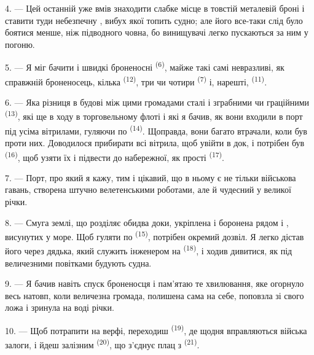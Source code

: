 \VUsaut{3.0mm}
\VUsaut{3.0mm}

4. --- Цей останній уже вмів  знаходити слабке місце в товстій
металевій броні і ставити туди небезпечну , вибух якої топить
судно; але його все-таки слід було боятися менше, ніж підводного човна, бо
винищувачі легко пускаються за ним у погоню.

5. --- Я міг бачити і швидкі броненосні  \textsuperscript{(6)},
майже такі самі невразливі, як справжній броненосець, кілька
 \textsuperscript{(12)}, три чи чотири 
\textsuperscript{(7)} і, нарешті,  \textsuperscript{(11)}.

6. --- Яка різниця в будові між цими громадами сталі і зграбними
 чи граційними 
\textsuperscript{(13)}, які ще в ходу в торговельному флоті і які я бачив, як
вони входили в порт під усіма вітрилами, гуляючи по 
\textsuperscript{(14)}. Щоправда, вони багато втрачали, коли  був
проти них. Доводилося прибирати всі вітрила, щоб увійти в док, і потрібен був
 \textsuperscript{(16)}, щоб узяти їх і підвести до набережної, як
прості  \textsuperscript{(17)}.

\VUsaut{3.0mm}
\VUsaut{3.0mm}

7. --- Порт, про який я кажу, тим і цікавий, що в ньому є не тільки військова
гавань, створена штучно велетенськими роботами, але й чудесний
 у  великої річки.

8. --- Смуга землі, що розділяє обидва доки, укріплена і боронена рядом
 і , висунутих у море. Щоб гуляти по
 \textsuperscript{(15)}, потрібен окремий дозвіл. Я легко дістав
його через дядька, який служить інженером на 
\textsuperscript{(18)}, і ходив дивитися, як під величезними повітками будують
судна.

9. --- Я бачив навіть спуск броненосця і пам'ятаю те хвилювання, яке огорнуло
весь натовп, коли величезна громада, полишена сама на себе, поповзла зі свого
ложа і зринула на воді річки.

10. --- Щоб потрапити на верфі, переходиш  \textsuperscript{(19)},
де щодня вправляються війська залоги, і йдеш залізним 
\textsuperscript{(20)}, що з'єднує плац з 
\textsuperscript{(21)}.

